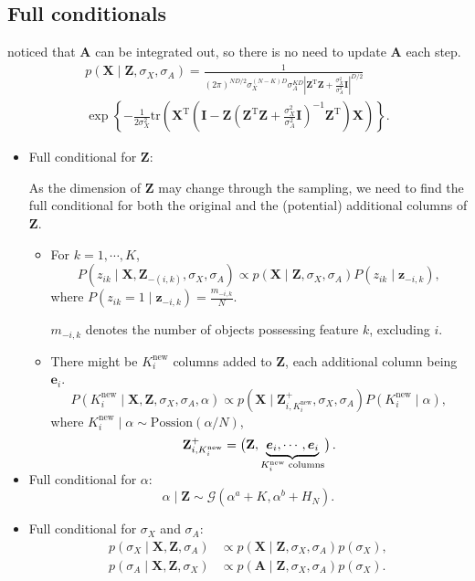 \documentclass{article}
\begin{document}
\subsection{Full conditionals}
  \citet{griffiths2005infinite} noticed that $\mathbf{A}$ can be integrated out, so there is no need to update $\mathbf{A}$ each step.
  \begin{multline}
    p(\mathbf{X}\mid \mathbf{Z}, \sigma_X, \sigma_A) = \frac{1}{(2\pi)^{ND/2}\sigma_X^{(N-K)D}\sigma_A^{KD}|{\mathbf{Z}}^{\mathrm{T}}\mathbf{Z}+\frac{\sigma_X^2}{\sigma_A^2}\mathbf{I}|^{D/2}} \\
    \exp\left\{-\frac{1}{2\sigma_X^2}\mathrm{tr}({\mathbf{X}}^{\mathrm{T}}(\mathbf{I}-\mathbf{Z}({\mathbf{Z}}^{\mathrm{T}}\mathbf{Z}+\frac{\sigma_X^2}{\sigma_A^2}\mathbf{I})^{-1}{\mathbf{Z}}^{\mathrm{T}})\mathbf{X})\right\}.
  \end{multline}
\begin{itemize}
  \item Full conditional for $\mathbf{Z}$:
  
  As the dimension of $\mathbf{Z}$ may change through the sampling, we need to find the full conditional for both the original and the (potential) additional columns of $\mathbf{Z}$.
  \begin{itemize}
    \item For $k = 1, \cdots, K$, $$P(z_{ik}\mid \mathbf{X},\mathbf{Z}_{-(i,k)}, \sigma_X, \sigma_A)\propto p(\mathbf{X}\mid \mathbf{Z}, \sigma_X, \sigma_A)P(z_{ik}\mid \boldsymbol{z}_{-i, k}),$$
    where $P(z_{ik} = 1\mid\boldsymbol{z}_{-i, k}) = \frac{m_{-i, k}}{N}$.

    $m_{-i,k}$ denotes the number of objects possessing feature $k$, excluding $i$.
    \item There might be $K_i^\text{new}$ columns added to $\mathbf{Z}$, each additional column being $\boldsymbol{e}_i$.
    $$P(K_i^\text{new}\mid \mathbf{X},\mathbf{Z},\sigma_X,\sigma_A,\alpha) \propto p(\mathbf{X}\mid \mathbf{Z}_{i,K_i^\text{new}}^{+},\sigma_X,\sigma_A)P(K_i^\text{new}\mid\alpha),$$
    where $K_i^\text{new}\mid \alpha \sim \mathrm{Possion}(\alpha/N)$, $$\mathbf{Z}_{i,K_i^\text{new}}^+ = \begin{pmatrix}
      \mathbf{Z}, \smash{\underbrace{\boldsymbol{e}_i, \cdots, \boldsymbol{e}_i}_{K_i^\mathrm{new}\text{ columns}}}
    \end{pmatrix}.$$
  \end{itemize}
  \item Full conditional for $\alpha$:
  $$\alpha\mid \mathbf{Z}\sim \mathcal{G}(\alpha^a + K, \alpha^b + H_N).$$
  \item Full conditional for $\sigma_X$ and $\sigma_A$:
  $$
  \begin{aligned}
    p(\sigma_X\mid \mathbf{X}, \mathbf{Z}, \sigma_A) &\propto p(\mathbf{X}\mid \mathbf{Z},\sigma_X, \sigma_A) p(\sigma_X), \\
    p(\sigma_A\mid \mathbf{X}, \mathbf{Z}, \sigma_X) &\propto p(\mathbf{A}\mid \mathbf{Z},\sigma_X, \sigma_A) p(\sigma_X). \\
  \end{aligned}
  $$
\end{itemize}
\end{document}
